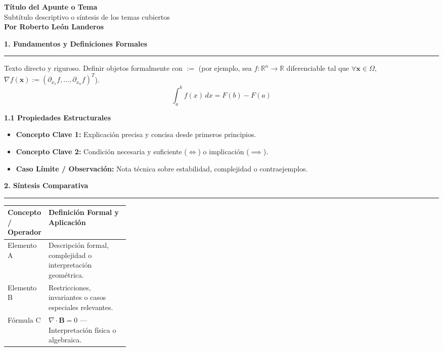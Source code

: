 \documentclass[10pt, landscape, twocolumn]{article}
\newcommand{\cheatsheetsection}[1]{
    \vspace{0.6em}
    {\color{themeblue}\large\bfseries #1} \par
    \vspace{-0.5em}
    {\color{themeblue}\rule{\linewidth}{1pt}} \par
    \vspace{0.2em}
}
\newcommand{\cheatsheetsubsection}[1]{
    \vspace{0.4em}
    {\color{themeblue}\normalsize\bfseries #1} \par
    \vspace{0.1em}
}
\begin{document}
\begin{center}
    \vspace{-1em}
    {\color{themeblue}\huge\bfseries Título del Apunte o Tema}\\[0.1em]
    {\color{themegray}\small Subtítulo descriptivo o síntesis de los temas cubiertos}\\[0.4em]
    {\color{themegray}\footnotesize \textbf{Por Roberto León Landeros}}
\end{center}
\vspace{-0.8em}

\cheatsheetsection{1. Fundamentos y Definiciones Formales}
Texto directo y riguroso. Definir objetos formalmente con $:=$ (por ejemplo, sea $f : \mathbb{R}^n \to \mathbb{R}$ diferenciable tal que $\forall \mathbf{x} \in \Omega$, $\nabla f(\mathbf{x}) := (\partial_{x_1} f, \dots, \partial_{x_n} f)^T$).
\[ \int_{a}^{b} f(x) \, dx = F(b) - F(a) \]

\cheatsheetsubsection{1.1 Propiedades Estructurales}
\begin{itemize}[leftmargin=*, nosep]
    \item \textbf{Concepto Clave 1:} Explicación precisa y concisa desde primeros principios.
    \item \textbf{Concepto Clave 2:} Condición necesaria y suficiente ($\iff$) o implicación ($\implies$).
    \item \textbf{Caso Límite / Observación:} Nota técnica sobre estabilidad, complejidad o contraejemplos.
\end{itemize}

\cheatsheetsection{2. Síntesis Comparativa}
\vspace{0.2em}
\renewcommand{\arraystretch}{1.2}
\begin{tabularx}{\linewidth}{|p{0.28\linewidth}|X|}
\hline
\rowcolor{setblue}
\textbf{Concepto / Operador} & \textbf{Definición Formal y Aplicación} \\ \hline
Elemento A & Descripción formal, complejidad o interpretación geométrica. \\ \hline
Elemento B & Restricciones, invariantes o casos especiales relevantes. \\ \hline
Fórmula C & $\nabla \cdot \mathbf{B} = 0$ --- Interpretación física o algebraica. \\ \hline
\end{tabularx}
\end{document}
